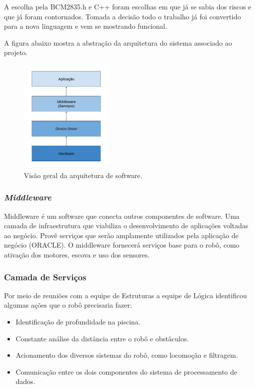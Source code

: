 A escolha pela BCM2835.h e C++ foram escolhas em que já se sabia dos riscos e que já foram contornados. Tomada a decisão todo o trabalho já foi convertido para a nova linguagem e vem se mostrando funcional.

A figura abaixo mostra a abstração da arquitetura do sistema associado ao projeto.
\par
\begin{figure}[h]
  \centering
  \includegraphics[width=0.4\textwidth]{figures/schema-arch.jpg}
  \caption{Visão geral da arquitetura de software.}
  \label{fig:schema-arch}
\end{figure}
\FloatBarrier
\par

\subsubsection{\textit{Middleware}}
Middleware é um software que conecta outros componentes de software. Uma camada de infraestrutura que viabiliza o desenvolvimento de aplicações voltadas ao negócio. Provê serviços que serão amplamente utilizados pela aplicação de negócio (ORACLE). O middleware fornecerá serviços base para o robô, como ativação dos motores, escova e uso dos sensores.

\subsubsection{Camada de Serviços}
Por meio de reuniões com a equipe de Estruturas a equipe de Lógica identificou algumas ações que o robô precisaria fazer:
\begin{itemize}
\item Identificação de profundidade na piscina.
\item Constante análise da distância entre o robô e obstâculos.
\item Acionamento dos diversos sistemas do robô, como locomoção e filtragem.
\item Comunicação entre os dois componentes do sistema de processamento de dados.
\end{itemize}

